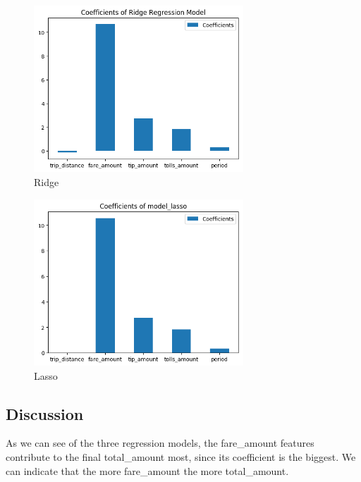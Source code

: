\documentclass[11pt]{article}
\begin{document}
\begin{figure}[!h]
    \centering
    \includegraphics[width=0.7\textwidth]{plots/p12.png}
    \caption{Ridge} %
    \label{fig:image4}
\end{figure}


\begin{figure}[!h]
    \centering
    \includegraphics[width=0.7\textwidth]{plots/p13.png}
    \caption{Lasso} %
    \label{fig:image4}
\end{figure}


\subsection{Discussion}
As we can see of the three regression models, the fare\_amount features contribute to the final total\_amount most, since its coefficient is the biggest. We can indicate that the more fare\_amount the more total\_amount.
\end{document}
